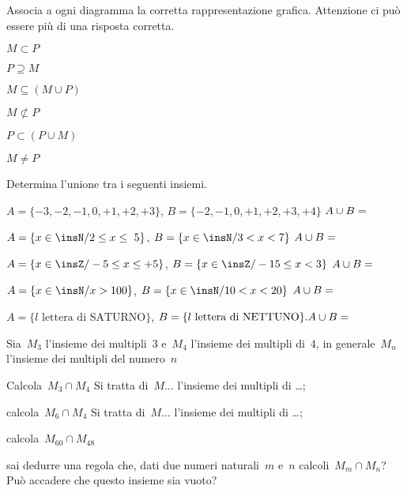 \begin{esercizio}
\label{ese:7.44}
Associa a ogni diagramma la corretta rappresentazione grafica. Attenzione ci può 
essere più di una risposta corretta.
\begin{multicols}{2}
\begin{enumeratea}
 \item $M\subset P$ \hfill\boxA\quad\boxB\quad\boxC\quad\boxD\quad\boxE
\item $P\supseteq M$ \hfill\boxA\quad\boxB\quad\boxC\quad\boxD\quad\boxE
\item $M\subseteq (M\cup P)$ \hfill\boxA\quad\boxB\quad\boxC\quad\boxD\quad\boxE
\item $M\not\subset P$ \hfill\boxA\quad\boxB\quad\boxC\quad\boxD\quad\boxE
\item $P\subset (P\cup M)$ \hfill\boxA\quad\boxB\quad\boxC\quad\boxD\quad\boxE
\item $M\neq P$ \hfill\boxA\quad\boxB\quad\boxC\quad\boxD\quad\boxE
\end{enumeratea}
\end{multicols}
\begin{center}

\end{center}
\end{esercizio}

\begin{esercizio}
\label{ese:7.45}
Determina l'unione tra i seguenti insiemi.

\begin{enumeratea}
 \item $A=\{-3,-2,-1,0,+1,+2,+3\}$, $B=\{-2,-1,0,+1,+2,+3,+4\}$ $A\cup 
B=\dotfill$
 \item $A=\{x\in\insN/2\le x\le~5\}$, $B=\{x\in\insN/3<x<7\}$ $A\cup B=\dotfill$
 \item $A=\{x\in\insZ/-5\le x\le +5\}$, $B=\{x\in\insZ/-15\le x<3\}$ $A\cup 
B=\dotfill$
 \item $A=\{x\in\insN/x>100\}$, $B=\{x\in \insN/10<x<20\}$ $A\cup B=\dotfill$
 \item $A=\{l\text{ lettera di SATURNO}\}$, $B=\{l\text{ lettera di NETTUNO}\}. 
A\cup B=\dotfill$
\end{enumeratea}
\end{esercizio}

\begin{esercizio}
\label{ese:7.46}
Sia~$M_{3}$ l'insieme dei multipli~3 e~$M_{4}$ l'insieme dei multipli di~4, in
generale~$M_{n}$ l'insieme dei multipli del numero~$n$
\vspace{-6pt}
 \begin{enumeratea}
 \item Calcola~$M_{3}\cap M_{4}$ Si tratta di~$M\ldots$ l'insieme dei multipli 
di \ldots;
 \item calcola~$M_{6}\cap M_{4}$ Si tratta di~$M\ldots$ l'insieme dei multipli 
di \ldots;
 \item calcola~$M_{60}\cap M_{48}$
 \item sai dedurre una regola che, dati due numeri naturali~$m$ e~$n$ 
calcoli~$M_{m}\cap M_{n}$? Può accadere che questo insieme sia vuoto?
 \end{enumeratea}
\end{esercizio}



